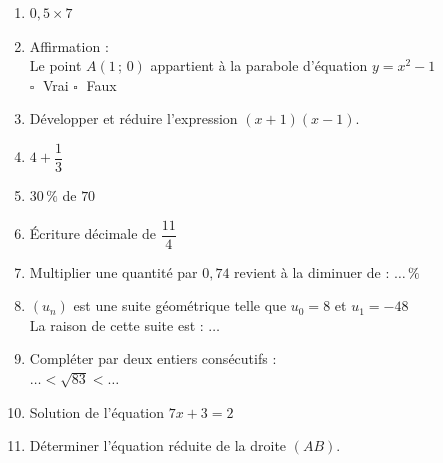 \documentclass[a4paper,11pt,landscape,exos]{nsi} %
\begin{document}
\begin{multicols}{2}
\maketitle

\begin{enumerate}[itemsep=1em]
	\item $0{,}5\times7$
	\item Affirmation : \\
    Le point $A(1\,;\,0)$ appartient à la parabole d'équation $y=x^2-1$ \\	$\square\;$ Vrai \qquad $\square\;$ Faux\qquad 
	\item Développer et réduire l'expression $(x+1)(x-1)$.\\
	\item $4+\dfrac{1}{3}$ 
	\item $30\,\%$ de $70$
	\item Écriture décimale de   $\dfrac{11}{4}$ \\
	\item Multiplier une quantité par $0{,}74$ revient à la diminuer de : $\ldots\,\%$
	\item $(u_n)$ est une suite géométrique telle que $u_0=8$ et $u_1=-48$\\La raison de cette suite est :  $\ldots$
	\item Compléter par deux entiers consécutifs : \\$\ldots < \sqrt{83} < \ldots$
	\item Solution de l'équation $7x+3=2$\\
	\item Déterminer l'équation réduite de la droite $(AB)$.\\    \begin{tikzpicture}[baseline,scale = 0.6]


\end{tikzpicture}
\end{enumerate}
\end{multicols}
\end{document}
